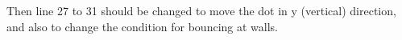 Then line 27 to 31 should be changed to move the dot in y (vertical) direction, and also to change the condition for bouncing at walls.